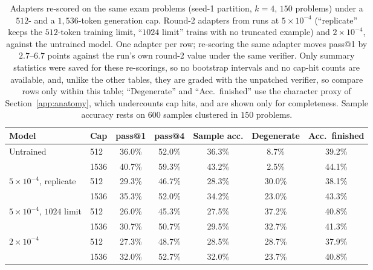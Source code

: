 \documentclass[runningheads]{llncs}
\begin{document}
\begin{table}[t]
\caption{Adapters re-scored on the same exam problems (seed-1 partition, $k=4$,
$150$ problems) under a $512$- and a $1{,}536$-token generation cap. Round-2
adapters from runs at $5\times10^{-4}$ (``replicate'' keeps the $512$-token
training limit, ``$1024$ limit'' trains with no truncated example) and
$2\times10^{-4}$, against the untrained model. One adapter per row; re-scoring
the same adapter moves pass@1 by $2.7$--$6.7$ points against the run's own
round-2 value under the same verifier. Only summary statistics were saved for these re-scorings, so no
bootstrap intervals and no cap-hit counts are available, and, unlike the other
tables, they are graded with the unpatched verifier, so compare rows only within
this table; ``Degenerate'' and
``Acc.\ finished'' use the character proxy of Section~\ref{app:anatomy}, which
undercounts cap hits, and are shown only for completeness. Sample accuracy
rests on $600$ samples clustered in $150$ problems.}
\label{tab:reeval}
\centering
\setlength{\tabcolsep}{3pt}
\begin{tabular}{llccccc}
\toprule
Model & Cap & pass@1 & pass@4 & Sample acc. & Degenerate & Acc.\ finished \\
\midrule
Untrained                & 512  & 36.0\% & 52.0\% & 36.3\% & 8.7\%  & 39.2\% \\
                         & 1536 & 40.7\% & 59.3\% & 43.2\% & 2.5\%  & 44.1\% \\
$5\times10^{-4}$, replicate & 512  & 29.3\% & 46.7\% & 28.3\% & 30.0\% & 38.1\% \\
                         & 1536 & 35.3\% & 52.0\% & 34.2\% & 23.0\% & 43.3\% \\
$5\times10^{-4}$, $1024$ limit & 512  & 26.0\% & 45.3\% & 27.5\% & 37.2\% & 40.8\% \\
                         & 1536 & 30.7\% & 50.7\% & 29.5\% & 32.7\% & 41.3\% \\
$2\times10^{-4}$         & 512  & 27.3\% & 48.7\% & 28.5\% & 28.7\% & 37.9\% \\
                         & 1536 & 32.0\% & 52.7\% & 32.0\% & 23.7\% & 40.8\% \\
\bottomrule
\end{tabular}
\end{table}
\end{document}

